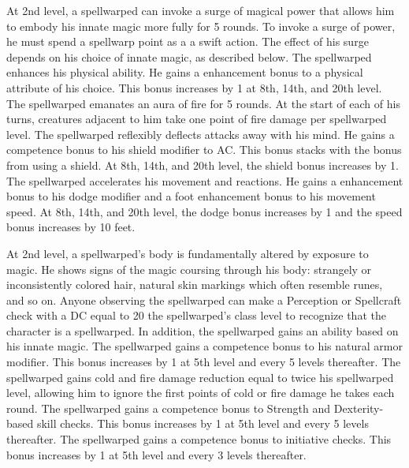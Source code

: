  At 2nd level, a spellwarped can invoke a surge of magical power that allows him to embody his innate magic more fully for 5 rounds. To invoke a surge of power, he must spend a spellwarp point as a a swift action. The effect of his surge depends on his choice of innate magic, as described below.
 The spellwarped enhances his physical ability. He gains a  enhancement bonus to a physical attribute of his choice. This bonus increases by 1 at 8th, 14th, and 20th level.
 The spellwarped emanates an aura of fire for 5 rounds. At the start of each of his turns, creatures adjacent to him take one point of fire damage per spellwarped level.
 The spellwarped reflexibly deflects attacks away with his mind. He gains a  competence bonus to his shield modifier to AC. This bonus stacks with the bonus from using a shield. At 8th, 14th, and 20th level, the shield bonus increases by 1.
 The spellwarped accelerates his movement and reactions. He gains a  enhancement bonus to his dodge modifier and a  foot enhancement bonus to his movement speed. At 8th, 14th, and 20th level, the dodge bonus increases by 1 and the speed bonus increases by 10 feet.

 At 2nd level, a spellwarped's body is fundamentally altered by exposure to magic. He shows signs of the magic coursing through his body: strangely or inconsistently colored hair, natural skin markings which often resemble runes, and so on. Anyone observing the spellwarped can make a Perception or Spellcraft check with a DC equal to 20 \sub the spellwarped's class level to recognize that the character is a spellwarped. In addition, the spellwarped gains an ability based on his innate magic.
 The spellwarped gains a  competence bonus to his natural armor modifier. This bonus increases by 1 at 5th level and every 5 levels thereafter.
 The spellwarped gains cold and fire damage reduction equal to twice his spellwarped level, allowing him to ignore the first points of cold or fire damage he takes each round.
 The spellwarped gains a  competence bonus to Strength and Dexterity-based skill checks. This bonus increases by 1 at 5th level and every 5 levels thereafter.
 The spellwarped gains a  competence bonus to initiative checks. This bonus increases by 1 at 5th level and every 3 levels thereafter.

